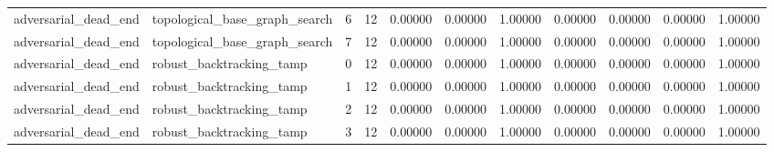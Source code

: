 \documentclass{article}
\begin{document}
\begin{table}[tbp]
{\begin{tabular}{lllllllllll}
adversarial\_dead\_end & topological\_base\_graph\_search & 6 & 12 & 0.00000 & 0.00000 & 1.00000 & 0.00000 & 0.00000 & 0.00000 & 1.00000 \\
adversarial\_dead\_end & topological\_base\_graph\_search & 7 & 12 & 0.00000 & 0.00000 & 1.00000 & 0.00000 & 0.00000 & 0.00000 & 1.00000 \\
adversarial\_dead\_end & robust\_backtracking\_tamp & 0 & 12 & 0.00000 & 0.00000 & 1.00000 & 0.00000 & 0.00000 & 0.00000 & 1.00000 \\
adversarial\_dead\_end & robust\_backtracking\_tamp & 1 & 12 & 0.00000 & 0.00000 & 1.00000 & 0.00000 & 0.00000 & 0.00000 & 1.00000 \\
adversarial\_dead\_end & robust\_backtracking\_tamp & 2 & 12 & 0.00000 & 0.00000 & 1.00000 & 0.00000 & 0.00000 & 0.00000 & 1.00000 \\
adversarial\_dead\_end & robust\_backtracking\_tamp & 3 & 12 & 0.00000 & 0.00000 & 1.00000 & 0.00000 & 0.00000 & 0.00000 & 1.00000 \\
\bottomrule
\end{tabular}
}
\end{table}

\clearpage
\end{document}
